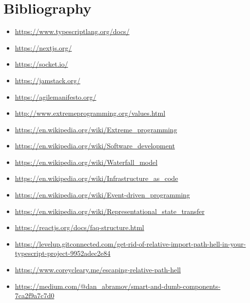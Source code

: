 \chapter*{Bibliography} 

\begin{itemize}
	\item \href{https://www.typescriptlang.org/docs/}{https://www.typescriptlang.org/docs/}
	\item \href{https://nextjs.org/}{https://nextjs.org/}
	\item \href{https://socket.io/}{https://socket.io/}
	\item \href{https://jamstack.org/}{https://jamstack.org/}
    \item \href{https://agilemanifesto.org/}{https://agilemanifesto.org/}
    \item \href{http://www.extremeprogramming.org/values.html}{http://www.extremeprogramming.org/values.html}
    \item \href{https://en.wikipedia.org/wiki/Extreme\_programming}{https://en.wikipedia.org/wiki/Extreme\_programming}
    \item \href{https://en.wikipedia.org/wiki/Software\_development}{https://en.wikipedia.org/wiki/Software\_development}
    \item \href{https://en.wikipedia.org/wiki/Waterfall\_model}{https://en.wikipedia.org/wiki/Waterfall\_model}
    \item \href{https://en.wikipedia.org/wiki/Infrastructure\_as\_code}{https://en.wikipedia.org/wiki/Infrastructure\_as\_code}
    \item \href{https://en.wikipedia.org/wiki/Event-driven\_programming}{https://en.wikipedia.org/wiki/Event-driven\_programming}
    \item \href{https://en.wikipedia.org/wiki/Representational\_state\_transfer}{https://en.wikipedia.org/wiki/Representational\_state\_transfer}
    \item \href{https://reactjs.org/docs/faq-structure.html}{https://reactjs.org/docs/faq-structure.html}
    \item \href{https://levelup.gitconnected.com/get-rid-of-relative-import-path-hell-in-your-typescript-project-9952adec2e84}{https://levelup.gitconnected.com/get-rid-of-relative-import-path-hell-in-your-typescript-project-9952adec2e84}
    \item \href{https://www.coreycleary.me/escaping-relative-path-hell}{https://www.coreycleary.me/escaping-relative-path-hell}
    \item \href{https://medium.com/@dan\_abramov/smart-and-dumb-components-7ca2f9a7c7d0}{https://medium.com/@dan\_abramov/smart-and-dumb-components-7ca2f9a7c7d0}

\end{itemize}
